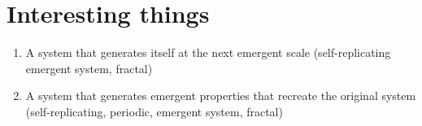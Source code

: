 \documentclass{article}
\begin{document}
\section{Interesting things}

  \begin{enumerate}[label=\textbf{\alph*)}]
    \item A system that generates itself at the next emergent scale (self-replicating emergent system, fractal)
    \item A system that generates emergent properties that recreate the original system (self-replicating, periodic, emergent system, fractal)
  \end{enumerate}


\iffalse
\section{Why can't bouncing balls create emergence?}
  
  What property of this system does not allow for emergence? Considering it has all of the conditions that are necessary. This is because their movement is stochastic, they are not a determinsitic system!
\fi
\end{document}
